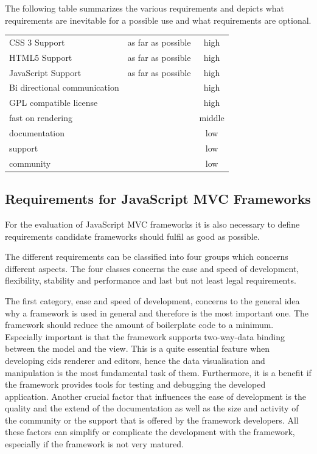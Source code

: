 The following table summarizes the various requirements and depicts what requirements are inevitable for a possible use and what requirements are optional.

\begin{minipage}{\linewidth}
\centering
 \label{tab:req_browser_comp}
\begin{tabulary}{\textwidth}{|l|C|c|}
 \hline 
{}
   &  &  \tabularnewline
 \hline
CSS 3 Support & as far as possible & high \\
HTML5 Support & as far as possible & high  \\
JavaScript Support & as far as possible & high \\
 Bi directional communication & & high \\
GPL compatible license & & high \\ \hline
fast on rendering & & middle\\
documentation & & low\\
support & & low \\
community & &low \\
 \hline 
 \end{tabulary}
 \end{minipage}

\subsection{Requirements for JavaScript MVC Frameworks}

For the evaluation of JavaScript MVC frameworks it is also necessary to define requirements candidate frameworks should fulfil as good as possible.

The different requirements can be classified into four groups which concerns different aspects.
The four classes concerns the ease and speed of development, flexibility, stability and performance and last but not least legal requirements.

The first category, ease and speed of development, concerns to the general idea why a framework is used in general and therefore is the most important one.
The framework should reduce the amount of boilerplate code to a minimum.
Especially important is that the framework supports two-way-data binding between the model and the view.
This is a quite essential feature when developing cids renderer and editors, hence the data visualisation and manipulation is the most fundamental task of them.
Furthermore, it is a benefit if the framework provides tools for testing and debugging the developed application.
Another crucial factor that influences the ease of development is the quality and the  extend of the documentation as well as the size and activity of the community or the support that is offered by the framework developers.
All these factors can simplify or complicate the development with the framework, especially if the framework is not very matured.

